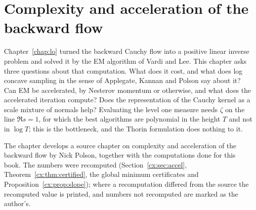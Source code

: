 \chapter{Complexity and acceleration of the backward flow}\label{chap:cx}

Chapter~\ref{chap:lo} turned the backward Cauchy flow into a positive linear inverse problem and solved it by the EM algorithm of Vardi and Lee. This chapter asks three questions about that computation. What does it cost, and what does log concave sampling in the sense of Applegate, Kannan and Polson say about it? Can EM be accelerated, by Nesterov momentum or otherwise, and what does the accelerated iteration compute? Does the representation of the Cauchy kernel as a scale mixture of normals help? Evaluating the level one measure needs $\zeta$ on the line $\Re s=1$, for which the best algorithms are polynomial in the height $T$ and not in $\log T$; this is the bottleneck, and the Thorin formulation does nothing to it.

The chapter develops a source chapter on complexity and acceleration of the backward flow by Nick Polson, together with the computations done for this book. The numbers were recomputed (Section~\ref{cx:sec:accel}, Theorem~\ref{cx:thm:certified}, the global minimum certificates and Proposition~\ref{cx:prop:slope}); where a recomputation differed from the source the recomputed value is printed, and numbers not recomputed are marked as the author's.

